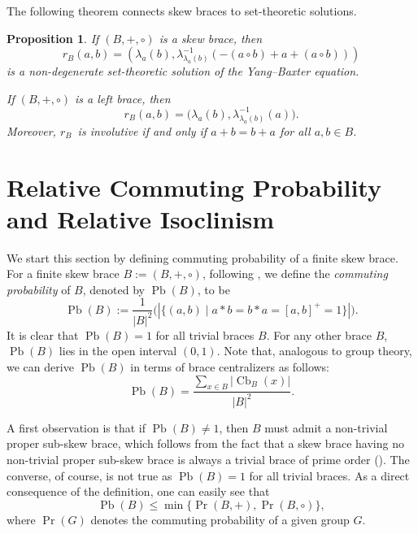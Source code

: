 \documentclass[11pt, oneside]{amsart}
\numberwithin{equation}{section}
\theoremstyle{plain}
\newtheorem{pro}[equation]{Proposition}
\theoremstyle{definition}
\newcommand{\Cb}{\operatorname{Cb} }
\newcommand{\Pb}{\operatorname{Pb} }
\renewcommand{\Pr}{\operatorname{Pr} }
\begin{document}
The following theorem \cite[Theorem 3.1]{GV17} connects skew braces to set-theoretic solutions.
\begin{pro} %
If $(B, +, \circ)$ is a skew  brace, then
\begin{equation*} %
r_B(a, b) = \left(\lambda_a(b), \lambda^{-1}_{\lambda_a(b)}(-(a \circ b) + a +(a \circ b)) \right)
\end{equation*}
is a non-degenerate set-theoretic solution of the Yang--Baxter equation.

If $(B, +, \circ)$ is a left brace, then
\begin{equation*} %
r_B(a, b) = \big(\lambda_a(b), \lambda^{-1}_{\lambda_a(b)}(a)\big).
\end{equation*}
Moreover, $r_B$~is involutive if and only if $a+b = b+a$ for all $a, b \in B$.
\end{pro}

  
  
  
  
  \section{Relative Commuting Probability and Relative Isoclinism}
  
  
  
  We start this section by defining  commuting probability of a finite skew  brace. For  a finite skew  brace  $B:= (B, +, \circ)$, following \cite{MY26}, we define the  \emph{commuting probability} of $B$, denoted by $\Pb(B)$, to be 
$$\Pb(B)  :=  \frac{1}{ |B|^{2}} \big(|\{(a, b) \mid a * b = b* a = [a, b]^+ = 1\}|\big).$$
It is clear that $\Pb(B) = 1$ for all  trivial braces $B$. For any other brace $B$,  $\Pb(B)$ lies in the open interval $(0, 1)$.
 Note that, analogous to group theory, we can derive $\Pb(B)$ in terms of brace centralizers as follows:
$$\Pb(B) = \frac{\sum_{x\in B}|\Cb_{B}(x)|}{|B|^2}.$$

A first observation is that if  $\Pb(B)  \ne  1$, then $B$ must admit a non-trivial proper sub-skew brace, which follows from the fact that a skew brace having no  non-trivial proper sub-skew brace is always a trivial brace of prime  order (\cite[Theorem A]{BEJP24}). The converse, of course, is not true as $\Pb(B) = 1$ for all trivial  braces. As a direct consequence of the definition, one can easily see that
$$\Pb(B) \leqslant \min\{\Pr(B, +), \Pr(B, \circ)\},$$
where $\Pr(G)$ denotes the commuting probability of a given group $G$.
  
\end{document}
